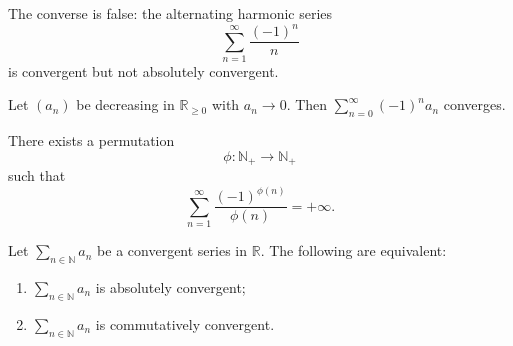 \begin{exampleenv}
The converse is false: the alternating harmonic series
\[
    \sum_{n=1}^{\infty}\frac{(-1)^n}{n}
\]
is convergent but not absolutely convergent.
\end{exampleenv}

\begin{lemmaenv}
Let $(a_n)$ be decreasing in $\mathbb R_{\ge0}$ with $a_n\to0$.
Then $\sum_{n=0}^{\infty}(-1)^n a_n$ converges.
\end{lemmaenv}

\begin{propositionenv}
There exists a permutation
\[
    \phi:\mathbb N_+\to\mathbb N_+
\]
such that
\[
    \sum_{n=1}^{\infty}
    \frac{(-1)^{\phi(n)}}{\phi(n)}
    =+\infty.
\]
\end{propositionenv}

\begin{theoremenv}[Riemann]
Let $\sum_{n\in\mathbb N}a_n$ be a convergent series in $\mathbb R$.
The following are equivalent:
\begin{enumerate}[label=(\Alph*)]
    \item $\sum_{n\in\mathbb N}a_n$ is absolutely convergent;
    \item $\sum_{n\in\mathbb N}a_n$ is commutatively convergent.
\end{enumerate}
\end{theoremenv}
